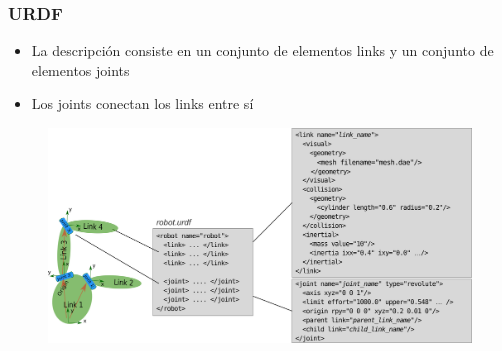 \begin{frame}
	\frametitle{URDF}
	
	\begin{itemize}
		\item La descripción consiste en un conjunto de elementos links y un conjunto de elementos joints
		\item Los joints conectan los links entre sí
	\end{itemize}
	
	\begin{figure}[!h]
		\centering
		\includegraphics[width=0.8\columnwidth]{images/urdf_driagram.pdf}
	\end{figure}
\end{frame}

